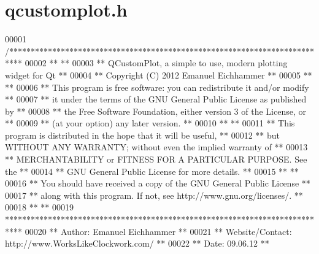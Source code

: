 \hypertarget{a00116_source}{\section{qcustomplot.\+h}
\label{a00116_source}
}

\begin{DoxyCode}
00001 \textcolor{comment}{/***************************************************************************}
00002 \textcolor{comment}{**                                                                        **}
00003 \textcolor{comment}{**  QCustomPlot, a simple to use, modern plotting widget for Qt           **}
00004 \textcolor{comment}{**  Copyright (C) 2012 Emanuel Eichhammer                                 **}
00005 \textcolor{comment}{**                                                                        **}
00006 \textcolor{comment}{**  This program is free software: you can redistribute it and/or modify  **}
00007 \textcolor{comment}{**  it under the terms of the GNU General Public License as published by  **}
00008 \textcolor{comment}{**  the Free Software Foundation, either version 3 of the License, or     **}
00009 \textcolor{comment}{**  (at your option) any later version.                                   **}
00010 \textcolor{comment}{**                                                                        **}
00011 \textcolor{comment}{**  This program is distributed in the hope that it will be useful,       **}
00012 \textcolor{comment}{**  but WITHOUT ANY WARRANTY; without even the implied warranty of        **}
00013 \textcolor{comment}{**  MERCHANTABILITY or FITNESS FOR A PARTICULAR PURPOSE.  See the         **}
00014 \textcolor{comment}{**  GNU General Public License for more details.                          **}
00015 \textcolor{comment}{**                                                                        **}
00016 \textcolor{comment}{**  You should have received a copy of the GNU General Public License     **}
00017 \textcolor{comment}{**  along with this program.  If not, see http://www.gnu.org/licenses/.   **}
00018 \textcolor{comment}{**                                                                        **}
00019 \textcolor{comment}{****************************************************************************}
00020 \textcolor{comment}{**           Author: Emanuel Eichhammer                                   **}
00021 \textcolor{comment}{**  Website/Contact: http://www.WorksLikeClockwork.com/                   **}
00022 \textcolor{comment}{**             Date: 09.06.12                                             **}

\end{DoxyCode}
